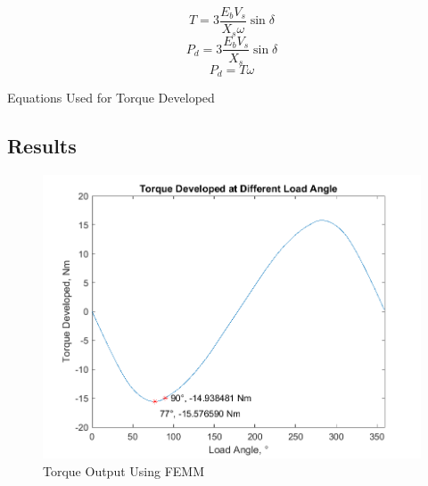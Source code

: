 \documentclass[12pt]{article}
\begin{document}
\begin{eqfloat}
    \begin{equation}\label{eq:circuit-td}
        T = 3 \frac{E_{b}V_{s}}{X_{s}\omega{}} \sin{\delta} 
    \end{equation}
    \begin{equation}\label{eq:pd-1}
        P_{d} = 3 \frac{E_{b}V_{s}}{X_{s}} \sin{\delta} 
    \end{equation}
    \begin{equation}\label{eq:pd-2}
        P_{d} = T \omega
    \end{equation}
    \caption{Equations Used for Torque Developed}
\end{eqfloat}

\subsection{Results}

\begin{figure}[H]
    \centering
    \includegraphics[width=\linewidth]{img/task_8_simulation.png}
    \caption{Torque Output Using FEMM}
    \label{fig:task-8-simulation}
\end{figure}
\end{document}
